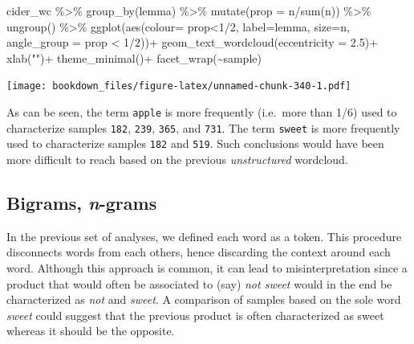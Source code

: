 \documentclass[
]{krantz}
\makeatletter
\newenvironment{Shaded}{\begin{snugshade}}{\end{snugshade}}
\newcommand{\AttributeTok}[1]{\textcolor[rgb]{0.61,0.61,0.61}{#1}}
\newcommand{\DecValTok}[1]{\textcolor[rgb]{0.06,0.06,0.06}{#1}}
\newcommand{\FloatTok}[1]{\textcolor[rgb]{0.06,0.06,0.06}{#1}}
\newcommand{\FunctionTok}[1]{\textcolor[rgb]{0,0,0}{#1}}
\newcommand{\NormalTok}[1]{#1}
\newcommand{\SpecialCharTok}[1]{\textcolor[rgb]{0,0,0}{#1}}
\newcommand{\StringTok}[1]{\textcolor[rgb]{0.5,0.5,0.5}{#1}}
\newenvironment{kframe}{%
\medskip{}
\setlength{\fboxsep}{.8em}
 \def\at@end@of@kframe{}%
 \ifinner\ifhmode%
  \def\at@end@of@kframe{\end{minipage}}%
  \begin{minipage}{\columnwidth}%
 \fi\fi%
 \def\FrameCommand##1{\hskip\@totalleftmargin \hskip-\fboxsep
 \colorbox{shadecolor}{##1}\hskip-\fboxsep
     \hskip-\linewidth \hskip-\@totalleftmargin \hskip\columnwidth}%
 \MakeFramed {\advance\hsize-\width
   \@totalleftmargin\z@ \linewidth\hsize
   \@setminipage}}%
 {\par\unskip\endMakeFramed%
 \at@end@of@kframe}
\renewenvironment{Shaded}{\begin{kframe}}{\end{kframe}}
\makeatother
\begin{document}
\begin{Shaded}
\begin{Highlighting}[]
\NormalTok{cider\_wc }\SpecialCharTok{\%\textgreater{}\%} 
  \FunctionTok{group\_by}\NormalTok{(lemma) }\SpecialCharTok{\%\textgreater{}\%} 
  \FunctionTok{mutate}\NormalTok{(}\AttributeTok{prop =}\NormalTok{ n}\SpecialCharTok{/}\FunctionTok{sum}\NormalTok{(n)) }\SpecialCharTok{\%\textgreater{}\%} 
  \FunctionTok{ungroup}\NormalTok{() }\SpecialCharTok{\%\textgreater{}\%} 
  \FunctionTok{ggplot}\NormalTok{(}\FunctionTok{aes}\NormalTok{(}\AttributeTok{colour=}\NormalTok{ prop}\SpecialCharTok{\textless{}}\DecValTok{1}\SpecialCharTok{/}\DecValTok{2}\NormalTok{, }\AttributeTok{label=}\NormalTok{lemma, }\AttributeTok{size=}\NormalTok{n, }
             \AttributeTok{angle\_group =}\NormalTok{ prop }\SpecialCharTok{\textless{}} \DecValTok{1}\SpecialCharTok{/}\DecValTok{2}\NormalTok{))}\SpecialCharTok{+}
  \FunctionTok{geom\_text\_wordcloud}\NormalTok{(}\AttributeTok{eccentricity =} \FloatTok{2.5}\NormalTok{)}\SpecialCharTok{+}
  \FunctionTok{xlab}\NormalTok{(}\StringTok{""}\NormalTok{)}\SpecialCharTok{+}
  \FunctionTok{theme\_minimal}\NormalTok{()}\SpecialCharTok{+}
  \FunctionTok{facet\_wrap}\NormalTok{(}\SpecialCharTok{\textasciitilde{}}\NormalTok{sample)}
\end{Highlighting}
\end{Shaded}

\texttt{[image: bookdown\_files/figure-latex/unnamed-chunk-340-1.pdf]}

As can be seen, the term \texttt{apple} is more frequently (i.e.~more than 1/6) used to characterize samples \texttt{182}, \texttt{239}, \texttt{365}, and \texttt{731}. The term \texttt{sweet} is more frequently used to characterize samples \texttt{182} and \texttt{519}. Such conclusions would have been more difficult to reach based on the previous \emph{unstructured} wordcloud.

\hypertarget{bigrams-n-grams}{%
\subsection{\texorpdfstring{Bigrams, \emph{n}-grams}{Bigrams, n-grams}}\label{bigrams-n-grams}}

In the previous set of analyses, we defined each word as a token. This procedure disconnects words from each others, hence discarding the context around each word. Although this approach is common, it can lead to misinterpretation since a product that would often be associated to (say) \emph{not sweet} would in the end be characterized as \emph{not} and \emph{sweet}. A comparison of samples based on the sole word \emph{sweet} could suggest that the previous product is often characterized as sweet whereas it should be the opposite.
\end{document}

